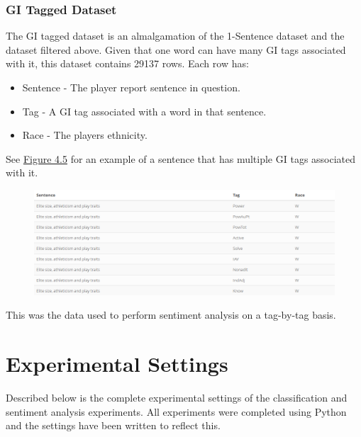 \documentclass[oneside,12pt]{Classes/RoboticsLaTeX}
\begin{document}
\subsection{GI Tagged Dataset}
The GI tagged dataset is an almalgamation of the 1-Sentence dataset and the dataset filtered above. Given that one word can have many GI tags associated with it, this dataset contains
29137 rows. Each row has:
\begin{itemize}
  \item Sentence - The player report sentence in question.
  \item Tag - A GI tag associated with a word in that sentence.
  \item Race - The players ethnicity.
\end{itemize}
See \hyperref[fig:1-sentence_gi_tag_example]{Figure 4.5} for an example of a sentence that has multiple GI tags associated with it.
\begin{figure}[ht!b]
  \centering
  \begin{minipage}{1\textwidth}
    \centering
    \includegraphics[width=1\linewidth]{Figures/1_sent_gi_tagged_specific.png}
    \label{fig:1-sentence_gi_tag_example}
  \end{minipage}%
\end{figure}
This was the data used to perform sentiment analysis on a tag-by-tag basis.


\chapter{Experimental Settings}
\label{chap:experiments}
Described below is the complete experimental settings of the classification and sentiment analysis experiments. All experiments were completed using Python and the settings have been written 
to reflect this.
\end{document}
